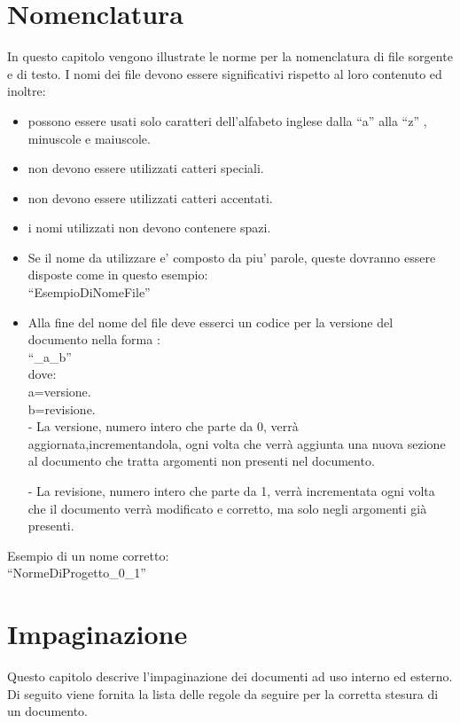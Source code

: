 \documentclass[11pt,titlepage,a4paper]{report}
\begin{document}
\section{Nomenclatura}
In questo capitolo vengono illustrate le norme per la nomenclatura di file sorgente e di testo.
I nomi dei file devono essere significativi rispetto al loro contenuto ed inoltre:\\
\begin{itemize}
\item possono essere usati solo caratteri dell'alfabeto inglese dalla ``a'' alla ``z'' , minuscole e maiuscole.
\item non devono essere utilizzati catteri speciali.
\item non devono essere utilizzati catteri accentati.
\item i nomi utilizzati non devono contenere spazi.
\item Se il nome da utilizzare e' composto da piu' parole,
queste dovranno essere disposte come in questo esempio: \\
``EsempioDiNomeFile''
\item Alla fine del nome del file deve esserci un codice per la versione 
del documento nella forma :\\ 
``\_a\_b'' \\

dove:\\
a=versione.\\
b=revisione.\\

- La versione, numero intero che parte da 0, verr\`a aggiornata,incrementandola,
ogni volta che verr\`a aggiunta una nuova sezione al documento che tratta argomenti non presenti nel documento.

- La revisione, numero intero che parte da 1, verr\`a incrementata ogni volta che il documento verr\`a modificato 
e corretto, ma solo negli argomenti gi\`a presenti.

\end{itemize}
Esempio di un nome corretto:\\
``NormeDiProgetto\_0\_1''

\section{Impaginazione}
Questo capitolo descrive l'impaginazione dei documenti ad uso interno ed esterno.
Di seguito viene fornita la lista delle regole da seguire per la corretta stesura di un documento.
\end{document}

